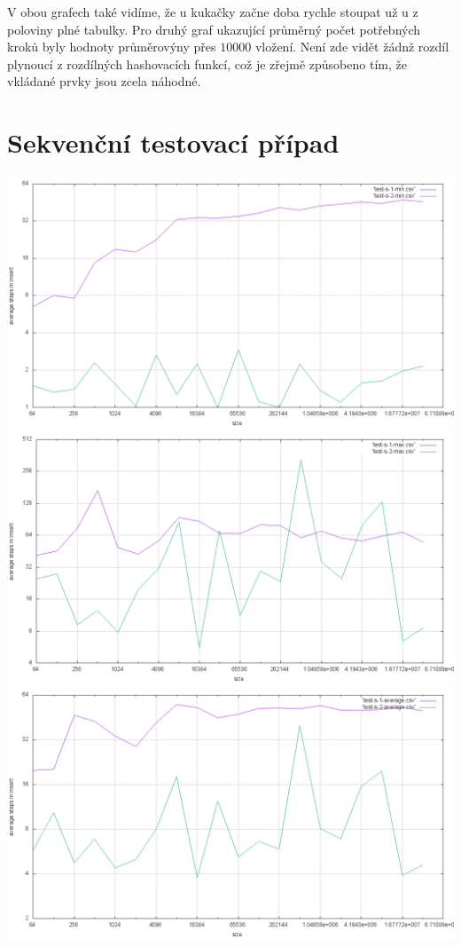 \documentclass[12pt,a4paper]{report}
\begin{document}
V obou grafech také vidíme, že u kukačky začne doba rychle stoupat už u z poloviny plné tabulky.
Pro druhý graf ukazující průměrný počet potřebných kroků byly hodnoty průměrovýny přes $10000$ vložení.
Není zde vidět žádnž rozdíl plynoucí z rozdílných hashovacích funkcí, což je zřejmě způsobeno tím, 
že vkládané prvky jsou zcela náhodné.


\section{Sekvenční testovací případ}

\includegraphics[width=\textwidth]{./tests/sequence_test/uniform-test1.png}
\includegraphics[width=\textwidth]{./tests/sequence_test/uniform-test2.png}
\includegraphics[width=\textwidth]{./tests/sequence_test/uniform-test3.png}
\end{document}
